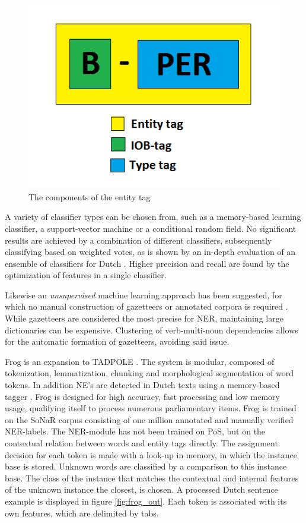 \begin{figure}
    \centering
    \includegraphics[scale=0.5]{fig/entity_tag}
    \caption{The components of the entity tag}
    \label{fig:iob}
\end{figure}

A variety of classifier types can be chosen from, such as a memory-based learning classifier, a support-vector machine or a conditional random field.
No significant results are achieved by a combination of different classifiers, subsequently classifying based on weighted votes, as is shown by an in-depth evaluation of an ensemble of classifiers for Dutch  \cite{desmet2014fine}. Higher precision and recall are found by the optimization of features in a single classifier.

Likewise an \emph{unsupervised} machine learning approach has been suggested, for which no manual construction of gazetteers or annotated corpora is required \cite{kazama2008inducing}. While gazetteers are considered the most precise for NER, maintaining large dictionaries can be expensive. Clustering of verb-multi-noun dependencies allows for the automatic formation of gazetteers, avoiding said issue.

Frog is an expansion to TADPOLE \cite{bosch2007efficient}. The system is modular, composed of tokenization, lemmatization, chunking and morphological segmentation of word tokens. In addition NE's are detected in Dutch texts using a memory-based tagger \cite{daelemans2010mbt}. Frog is designed for high accuracy, fast processing and low memory usage, qualifying itself to process numerous parliamentary items. Frog is trained on the SoNaR corpus consisting of one million annotated and manually verified NER-labels. The NER-module has not been trained on PoS, but on the contextual relation between words and entity tags directly.  The assignment decision for each token is made with a look-up in memory, in which the instance base is stored. Unknown words are classified by a comparison to this instance base. The class of the instance that matches the contextual and internal features of the unknown instance the closest, is chosen. A processed Dutch sentence example is displayed in figure \ref{fig:frog_out}. Each token is associated with its own features, which are delimited by tabs.


